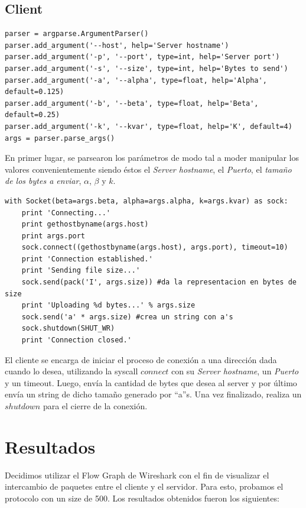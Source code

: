 \documentclass[10pt, a4paper]{article}
\begin{document}
\subsection{Client}
\begin{verbatim}
parser = argparse.ArgumentParser()
parser.add_argument('--host', help='Server hostname')
parser.add_argument('-p', '--port', type=int, help='Server port')
parser.add_argument('-s', '--size', type=int, help='Bytes to send')
parser.add_argument('-a', '--alpha', type=float, help='Alpha', default=0.125)
parser.add_argument('-b', '--beta', type=float, help='Beta', default=0.25)
parser.add_argument('-k', '--kvar', type=float, help='K', default=4)
args = parser.parse_args()
\end{verbatim}

En primer lugar, se parsearon los parámetros de modo tal a moder manipular los valores convenientemente siendo éstos el \textit{Server hostname}, el \textit{Puerto}, el \textit{tamaño de los bytes a enviar}, $\alpha$, $\beta$ y $k$.

\begin{verbatim}
with Socket(beta=args.beta, alpha=args.alpha, k=args.kvar) as sock:
    print 'Connecting...'
    print gethostbyname(args.host)
    print args.port
    sock.connect((gethostbyname(args.host), args.port), timeout=10)
    print 'Connection established.'
    print 'Sending file size...'
    sock.send(pack('I', args.size)) #da la representacion en bytes de size
    print 'Uploading %d bytes...' % args.size
    sock.send('a' * args.size) #crea un string con a's
    sock.shutdown(SHUT_WR)
	print 'Connection closed.'
\end{verbatim}

El cliente se encarga de iniciar el proceso de conexión a una dirección dada cuando lo desea, utilizando la syscall $connect$ con su \textit{Server hostname}, un \textit{Puerto} y un timeout. Luego, envía la cantidad de bytes que desea al server y por último envía un string de dicho tamaño generado por ``a''s. Una vez finalizado, realiza un $shutdown$ para el cierre de la conexión.

\newpage
\section{Resultados}

Decidimos utilizar el Flow Graph de Wireshark con el fin de visualizar el intercambio de paquetes entre el cliente y el servidor. Para esto, probamos el protocolo con un size de 500. Los resultados obtenidos fueron los siguientes:
\end{document}
